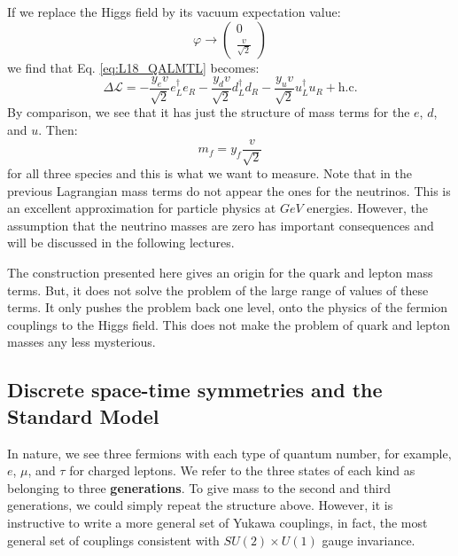 \documentclass[../../main/main.tex]{subfiles}
\begin{document}
If we replace the Higgs field by its vacuum expectation value:
\begin{equation}
	\varphi
	\longrightarrow
	\begin{pmatrix}
		0 \\
		\frac{v}{\sqrt{2}}
	\end{pmatrix}
	\label{eq:}
\end{equation}
we find that Eq. \ref{eq:L18_QALMTL} becomes:
\begin{equation}
	\Delta \mathcal{L}
	=
	- \frac{y_e v}{\sqrt{2}} e^\dag_L e_R
	- \frac{y_d v}{\sqrt{2}} d^\dag_L d_R
	- \frac{y_u v}{\sqrt{2}} u^\dag_L u_R
	+ \text{h.c.}
	\label{eq:}
\end{equation}
By comparison, we see that it has just the structure of mass terms for the \( e \), \( d \), and \( u \). Then:
\begin{equation}
	m_f
	=
	y_f \frac{v}{\sqrt{2}}
	\label{eq:}
\end{equation}
for all three species and this is what we want to measure. Note that in the previous Lagrangian mass terms do not appear the ones for the neutrinos. This is an excellent approximation for particle physics at \( \si{GeV} \) energies. However, the assumption that the neutrino masses are zero has important consequences and will be discussed in the following lectures.

The construction presented here gives an origin for the quark and lepton mass terms. But, it does not solve the problem of the large range of values of these terms. It only pushes the problem back one level, onto the physics of the fermion couplings to the Higgs field. This does not make the problem of quark and lepton masses any less mysterious.



\subsection{Discrete space-time symmetries and the Standard Model}
In nature, we see three fermions with each type of quantum number, for example, \( e \), \( \mu \), and \( \tau \) for charged leptons. We refer to the three states of each kind as belonging to three \textbf{generations}. To give mass to the second and third generations, we could simply repeat the structure above. However, it is instructive to write a more general set of Yukawa couplings, in fact, the most general set of couplings consistent with \( SU(2) \times U(1) \) gauge invariance.
\end{document}
